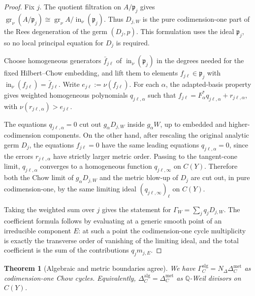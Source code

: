 \documentclass[11pt]{amsart}
\newtheorem{theorem}{Theorem}[section]
\theoremstyle{definition}
\theoremstyle{remark}
\begin{document}
\begin{proof}
Fix $j$. The quotient filtration on $A/\mathfrak p_j$ gives
$\operatorname{gr}_\nu(A/\mathfrak p_j)\cong
\operatorname{gr}_\nu A/\operatorname{in}_\nu(\mathfrak p_j)$. Thus $D_{j,W}$
is the pure codimension-one part of the Rees degeneration of the germ
$(D_j,p)$. This formulation uses the ideal $\mathfrak p_j$, so no local
principal equation for $D_j$ is required.

Choose homogeneous generators $\bar f_{j\ell}$ of
$\operatorname{in}_\nu(\mathfrak p_j)$ in the degrees needed for the fixed
Hilbert--Chow embedding, and lift them to elements
$f_{j\ell}\in\mathfrak p_j$ with
$\operatorname{in}_\nu(f_{j\ell})=\bar f_{j\ell}$. Write
$e_{j\ell}:=\nu(f_{j\ell})$. For each $\alpha$, the adapted-basis property gives
weighted homogeneous polynomials $q_{j\ell,\alpha}$ such that
$f_{j\ell}=F_\alpha^*q_{j\ell,\alpha}+r_{j\ell,\alpha}$, with
$\nu(r_{j\ell,\alpha})>e_{j\ell}$.

The equations $q_{j\ell,\alpha}=0$ cut out $g_\alpha D_{j,W}$ inside
$g_\alpha W$, up to embedded and higher-codimension components. On the other
hand, after rescaling the original analytic germ $D_j$, the equations
$f_{j\ell}=0$ have the same leading equations $q_{j\ell,\alpha}=0$, since the
errors $r_{j\ell,\alpha}$ have strictly larger metric order. Passing to the
tangent-cone limit, $q_{j\ell,\alpha}$ converges to a homogeneous function
$q_{j\ell,\infty}$ on $C(Y)$. Therefore both the Chow limit of
$g_\alpha D_{j,W}$ and the metric blow-up of $D_j$ are cut out, in pure
codimension-one, by the same limiting ideal
$(q_{j\ell,\infty})_\ell$ on $C(Y)$.

Taking the weighted sum over $j$ gives the statement for
$\Gamma_W=\sum_j q_jD_{j,W}$. The coefficient formula follows by evaluating at a
generic smooth point of an irreducible component $E$: at such a point the
codimension-one cycle multiplicity is exactly the transverse order of vanishing
of the limiting ideal, and the total coefficient is the sum of the contributions
$q_jm_{j,E}$.
\end{proof}

\begin{theorem}[Algebraic and metric boundaries agree]
\label{thm:alg-met-boundary-agree}
We have $\Gamma_C^{\mathrm{alg}}=N_\Delta\Delta_C^{\mathrm{met}}$ as
codimension-one Chow cycles. Equivalently,
$\Delta_C^{\mathrm{alg}}=\Delta_C^{\mathrm{met}}$ as $\mathbb Q$-Weil divisors
on $C(Y)$.
\end{theorem}
\end{document}
